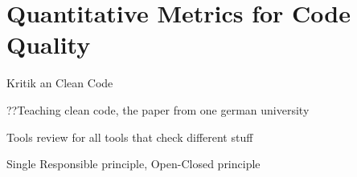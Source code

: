 \section{Quantitative Metrics for Code Quality}

Kritik an Clean Code

??Teaching clean code, the paper from one german university

Tools review for all tools that check different stuff

Single Responsible principle, Open-Closed principle

